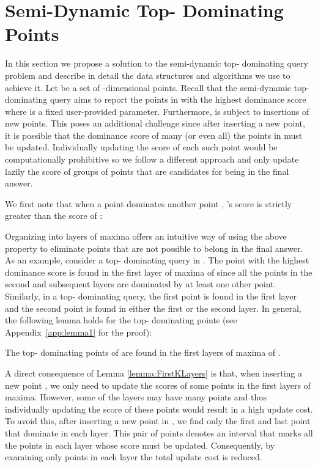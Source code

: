\documentclass{llncs}
\begin{document}
\section{Semi-Dynamic Top- Dominating Points} \label{section:SemiDynTopKDom}
In this section we propose a solution to the semi-dynamic top- dominating query problem and describe in detail the data structures and algorithms we use to achieve it.
Let  be a set of  -dimensional points. Recall that the semi-dynamic top- dominating query aims to report the  points in  with the highest dominance score where  is a fixed user-provided parameter. Furthermore,  is subject to insertions of new points. This poses an additional challenge since after inserting a new point, it is possible that the dominance score of many (or even all) the points in  must be updated. Individually updating the score of each such point would be computationally prohibitive so we follow a different approach and only update lazily the score of groups of points that are candidates for being in the final answer.

We first note that when a point  dominates another point , 's score is strictly greater than the score of :
\vspace{-0.2cm}


\vspace{-0.2cm}
Organizing  into layers of maxima offers an intuitive way of using the above property to eliminate points that are not possible to belong in the final answer. As an example, consider a top- dominating query in . The point with the highest dominance score is found in the first layer of maxima of  since all the points in the second and subsequent layers are dominated by at least one other point. Similarly, in a top- dominating query, the first point is found in the first layer and the second point is found in either the first or the second layer. In general, the following lemma holds for the top- dominating points (see Appendix~\ref{app:lemma1} for the proof):

\begin{lemma}\label{lemma:FirstKLayers}
The top- dominating points of  are found in the first  layers of maxima of .
\end{lemma}

A direct consequence of Lemma \ref{lemma:FirstKLayers} is that, when inserting a new point , we only need to update the scores of some points in the first  layers of maxima. However, some of the layers may have many points and thus individually updating the score of these points would result in a high update cost. To avoid this, after inserting a new point  in , we find only the first and last point that dominate  in each layer. This pair of points denotes an interval that marks all the points in each layer whose score must be updated. Consequently, by examining only  points in each layer the total update cost is reduced.
\end{document}
